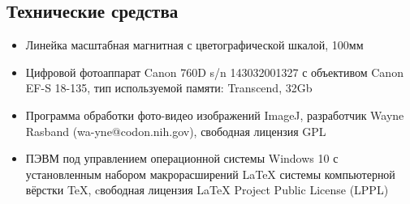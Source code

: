 \subsection{Технические средства}  %
\begin{itemize}
%
%
\item   Линейка масштабная магнитная с цветографической шкалой, 100мм
%
\item 	Цифровой фотоаппарат Canon 760D s/n 143032001327 с объективом Canon EF-S 18-135, тип используемой памяти: Transcend,  32Gb
%
%
\item  Программа обработки фото-видео изображений ImageJ, разработчик  Wayne Rasband (wa-yne@codon.nih.gov),
свободная лицензия GPL
%
\item  ПЭВМ под управлением операционной системы Windows 10 с установленным набором макрорасширений LaTeX системы компьютерной вёрстки TeX, cвободная лицензия LaTeX Project Public License (LPPL)
%	
\end{itemize}

